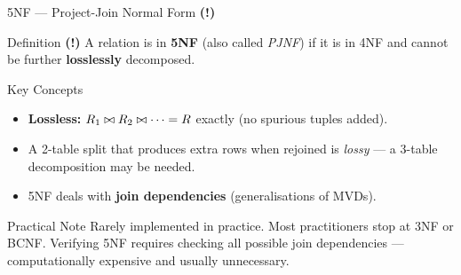 \begin{frame}{5NF --- Project-Join Normal Form \textbf{(!)}}
  \begin{block}{Definition \textbf{(!)}}
    A relation is in \textbf{5NF} (also called \emph{PJNF}) if it is in 4NF
    and cannot be further \textbf{losslessly} decomposed.
  \end{block}

  \begin{block}{Key Concepts}
    \begin{itemize}
      \item \textbf{Lossless:} $R_1 \bowtie R_2 \bowtie \cdots = R$ exactly
            (no spurious tuples added).
      \item A 2-table split that produces extra rows when rejoined is
            \emph{lossy} --- a 3-table decomposition may be needed.
      \item 5NF deals with \textbf{join dependencies} (generalisations of MVDs).
    \end{itemize}
  \end{block}

  \begin{alertblock}{Practical Note}
    Rarely implemented in practice.  Most practitioners stop at 3NF or BCNF.
    Verifying 5NF requires checking all possible join dependencies ---
    computationally expensive and usually unnecessary.
  \end{alertblock}
\end{frame}

